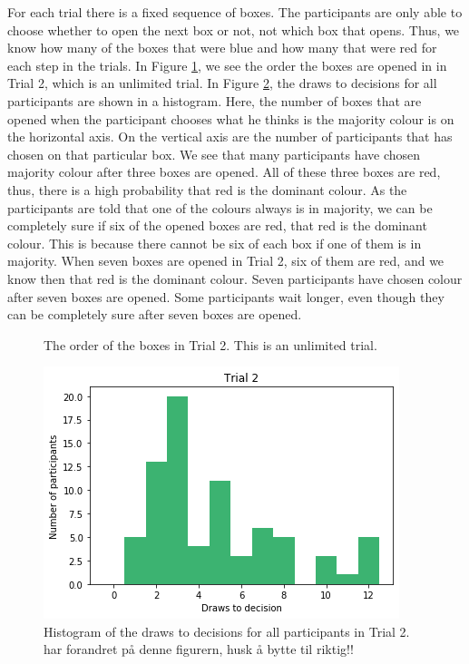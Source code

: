 For each trial there is a fixed sequence of boxes. The participants are only able to choose whether to open the next box or not, not which box that opens. Thus, we know how many of the boxes that were blue and how many that were red for each step in the trials. In Figure \ref{fig:trial2_order}, we see the order the boxes are opened in in Trial 2, which is an unlimited trial. In Figure \ref{fig:histogram_trial2}, the draws to decisions for all participants are shown in a histogram. Here, the number of boxes that are opened when the participant chooses what he thinks is the majority colour is on the horizontal axis. On the vertical axis are the number of participants that has chosen on that particular box. We see that many participants have chosen majority colour after three boxes are opened. All of these three boxes are red, thus, there is a high probability that red is the dominant colour. 
As the participants are told that one of the colours always is in majority, we can be completely sure if six of the opened boxes are red, that red is the dominant colour. This is because there cannot be six of each box if one of them is in majority. When seven boxes are opened in Trial 2, six of them are red, and we know then that red is the dominant colour. Seven participants have chosen colour after seven boxes are opened. Some participants wait longer, even though they can be completely sure after seven boxes are opened.
\begin{figure}
    \centering
    \scalebox{0.8}{}
    \caption[Order of Boxes in Trial 2]{The order of the boxes in Trial 2. This is an unlimited trial.}
    \label{fig:trial2_order}
\end{figure}


\begin{figure}
    \centering
    \includegraphics[scale=0.6]{pictures/dtd2_histogram.png}
    \caption[Draws to Decisions in Trial 2]{Histogram of the draws to decisions for all participants in Trial 2. 
    har forandret på denne figurern, husk å bytte til riktig!!}
    \label{fig:histogram_trial2}
\end{figure}


